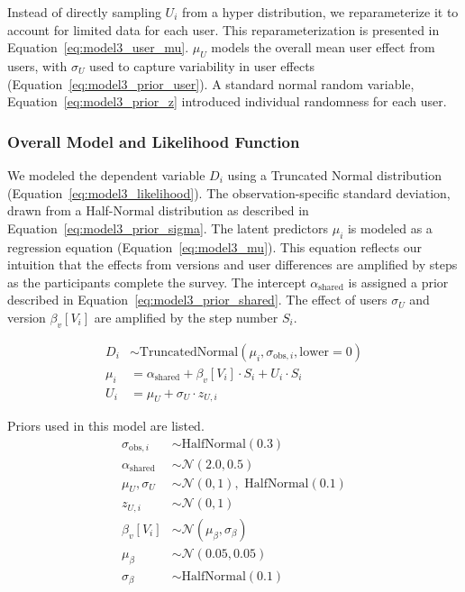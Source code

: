 Instead of directly sampling $U_i$ from a hyper distribution, we reparameterize it to account for limited data for each user. This reparameterization is presented in Equation~\ref{eq:model3_user_mu}. $\mu_{U}$ models the overall mean user effect from users, with $\sigma_{U}$ used to capture variability in user effects (Equation~\ref{eq:model3_prior_user}). A standard normal random variable, Equation~\ref{eq:model3_prior_z} introduced individual randomness for each user.


\subsubsection{Overall Model and Likelihood Function}
We modeled the dependent variable $D_i$ using a Truncated Normal distribution (Equation~\ref{eq:model3_likelihood}). The observation-specific standard deviation, drawn from a Half-Normal distribution as described in Equation~\ref{eq:model3_prior_sigma}. The latent predictors $\mu_i$ is modeled as a regression equation (Equation~\ref{eq:model3_mu}). This equation reflects our intuition that the effects from versions and user differences are amplified by steps as the participants complete the survey. The intercept $\alpha_{\text{shared}}$ is assigned a prior described in Equation~\ref{eq:model3_prior_shared}. The effect of users $\sigma_{U}$ and version $\beta_v[V_i]$ are amplified by the step number $S_i$.


\begin{align}
    D_i &\sim \text{TruncatedNormal}(\mu_i, \sigma_{\text{obs},i}, \text{lower}=0) \label{eq:model3_likelihood} \\
    \mu_i &= \alpha_{\text{shared}} + \beta_v[V_i] \cdot S_i + U_i \cdot S_i \label{eq:model3_mu} \\
    U_i &= \mu_{U} + \sigma_{U} \cdot z_{U,i} \label{eq:model3_user_mu}
\end{align}

Priors used in this model are listed.
\begin{align}
    \sigma_{\text{obs},i} &\sim \text{HalfNormal}(0.3) \label{eq:model3_prior_sigma} \\
    \alpha_{\text{shared}} &\sim \mathcal{N}(2.0, 0.5) \label{eq:model3_prior_shared} \\
    \mu_{U}, \sigma_{U} &\sim \mathcal{N}(0, 1), \text{ HalfNormal}(0.1) \label{eq:model3_prior_user} \\
    z_{U,i} &\sim \mathcal{N}(0, 1) \label{eq:model3_prior_z} \\
    \beta_v[V_i] &\sim \mathcal{N}(\mu_{\beta}, \sigma_{\beta}) \label{eq:model3_prior_beta} \\
    \mu_{\beta} &\sim \mathcal{N}(0.05, 0.05) \label{eq:model3_prior_beta_mu}\\
    \sigma_{\beta} &\sim \text{HalfNormal}(0.1) \label{eq:model3_prior_beta_sigma}
\end{align}


